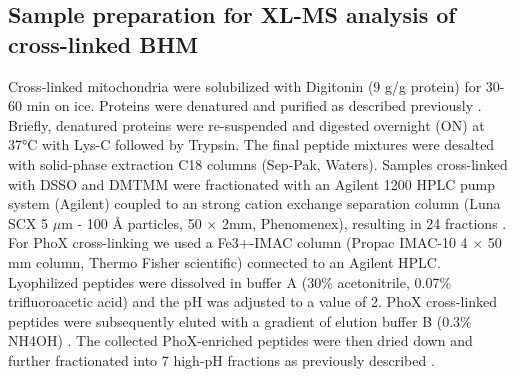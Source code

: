 \subsection*{Sample preparation for XL-MS analysis of cross-linked BHM}
Cross-linked mitochondria were solubilized with Digitonin (9 g/g protein) for 30-60 min on ice. Proteins were denatured and purified as described previously \cite{RN61}. Briefly, denatured proteins were re-suspended and digested overnight (ON) at 37°C with Lys-C followed by Trypsin. The final peptide mixtures were desalted with solid-phase extraction C18 columns (Sep-Pak, Waters). Samples cross-linked with DSSO and DMTMM were fractionated with an Agilent 1200 HPLC pump system (Agilent) coupled to an strong cation exchange separation column (Luna SCX 5 $\mu$m - 100 Å particles, 50 $\times$ 2mm, Phenomenex), resulting in 24 fractions . For PhoX cross-linking we used a Fe3+-IMAC column (Propac IMAC-10 4 $\times$ 50 mm column, Thermo Fisher scientific) connected to an Agilent HPLC. Lyophilized peptides were dissolved in buffer A (30\% acetonitrile, 0.07\% trifluoroacetic acid) and the pH was adjusted to a value of 2. PhoX cross-linked peptides were subsequently eluted with a gradient of elution buffer B (0.3\% NH4OH) \cite{RN62}. The collected PhoX-enriched peptides were then dried down and further fractionated into 7 high-pH fractions as previously described \cite{RN63}.
%
